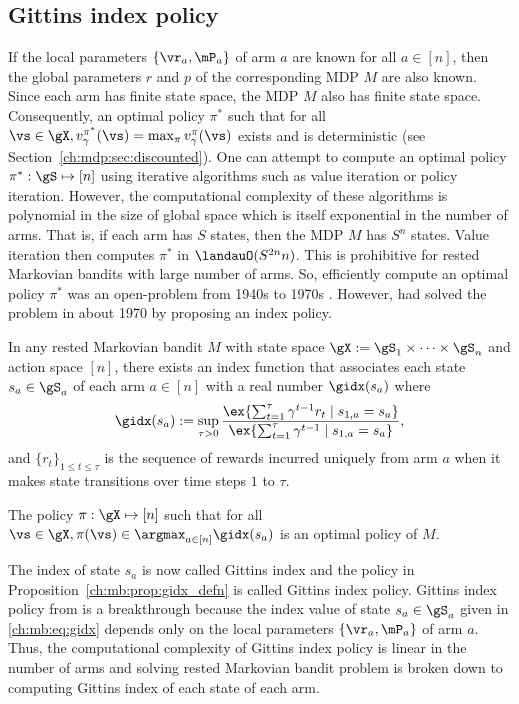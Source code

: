 \subsection{Gittins index policy}
\label{ssec:gittins_idx}

If the local parameters $\{\vr_a,\mP_a\}$ of arm $a$ are known for all $a\in[n]$, then the global parameters $r$ and $p$ of the corresponding MDP $M$ are also known.
Since each arm has finite state space, the MDP $M$ also has finite state space.
Consequently, an optimal policy $\pi^*$ such that for all $\vs\in\gX, v_\gamma^{\pi^*}(\vs)=\max_{\pi}v_\gamma^\pi(\vs)$ exists and is deterministic (see Section~\ref{ch:mdp:sec:discounted}).
One can attempt to compute an optimal policy $\pi^*:\gS\mapsto[n]$ using iterative algorithms such as value iteration or policy iteration.
However, the computational complexity of these algorithms is polynomial in the size of global space which is itself exponential in the number of arms.
That is, if each arm has $S$ states, then the MDP $M$ has $S^n$ states.
Value iteration then computes $\pi^*$ in $\landauO(S^{2n}n)$.
This is prohibitive for rested Markovian bandits with large number of arms.
So, efficiently compute an optimal policy $\pi^*$ was an open-problem from 1940s to 1970s \cite{whittle1996optimal}.
However, \cite{gittins1979bandit} had solved the problem in about 1970 by proposing an index policy.
\begin{prop}
    \label{ch:mb:prop:gidx_defn}
    In any rested Markovian bandit $M$ with state space $\gX:=\gS_1\times\dots\times\gS_n$ and action space $[n]$, there exists an index function that associates each state $s_a\in\gS_a$ of each arm $a\in[n]$ with a real number $\gidx(s_a)$ where
    \begin{equation}
        \label{ch:mb:eq:gidx}
        \gidx(s_a):=\sup_{\tau>0}\frac{\ex{\sum_{t=1}^{\tau}\gamma^{t-1}r_t \mid s_{1,a}=s_a}}{\ex{\sum_{t=1}^{\tau}\gamma^{t-1}\mid s_{1,a}=s_a}}, 
    \end{equation}
    and $\{r_t\}_{1\le t\le\tau}$ is the sequence of rewards incurred uniquely from arm $a$ when it makes state transitions over time steps $1$ to $\tau$.

    The policy $\pi:\gX\mapsto[n]$ such that for all $\vs\in\gX, \pi(\vs)\in\argmax_{a\in[n]}\gidx(s_a)$ is an optimal policy of $M$.
\end{prop}
The index of state $s_a$ is now called Gittins index and the policy in Proposition~\ref{ch:mb:prop:gidx_defn} is called Gittins index policy.
Gittins index policy from \cite{gittins1979bandit} is a breakthrough because the index value of state $s_a\in\gS_a$ given in \eqref{ch:mb:eq:gidx} depends only on the local parameters $\{\vr_a,\mP_a\}$ of arm $a$.
Thus, the computational complexity of Gittins index policy is linear in the number of arms and solving rested Markovian bandit problem is broken down to computing Gittins index of each state of each arm.

